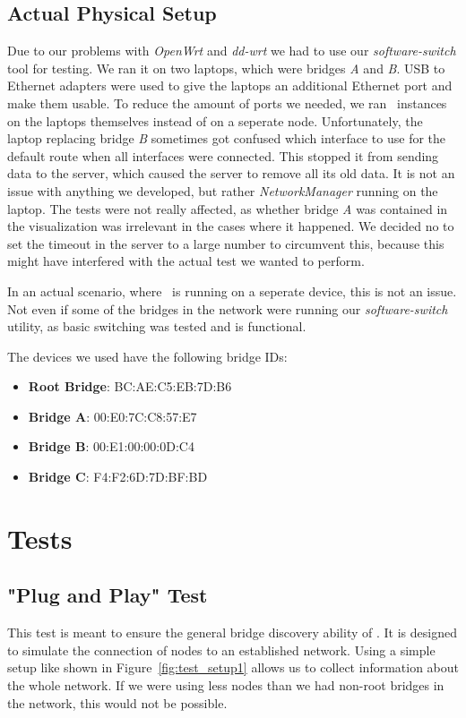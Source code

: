 \subsection*{Actual Physical Setup}
\label{physical_setup}
Due to our problems with \textit{OpenWrt} and \textit{dd-wrt} we had to use our \textit{software-switch} tool for testing.
We ran it on two laptops, which were bridges \textit{A} and \textit{B}.
USB to Ethernet adapters were used to give the laptops an additional Ethernet port and make them usable.
To reduce the amount of ports we needed, we ran \tool\ instances on the laptops themselves instead of on a seperate node.
Unfortunately, the laptop replacing bridge \textit{B} sometimes got confused which interface to use for the default route when all interfaces were connected.
This stopped it from sending data to the server, which caused the server to remove all its old data.
It is not an issue with anything we developed, but rather \textit{NetworkManager} running on the laptop.
The tests were not really affected, as whether bridge \textit{A} was contained in the visualization was irrelevant in the cases where it happened.
We decided no to set the timeout in the server to a large number to circumvent this, because this might have interfered with the actual test we wanted to perform.

In an actual scenario, where \tool\ is running on a seperate device, this is not an issue.
Not even if some of the bridges in the network were running our \textit{software-switch} utility, as basic switching was tested and is functional.

The devices we used have the following bridge IDs:
\begin{itemize}
    \item \textbf{Root Bridge}: BC:AE:C5:EB:7D:B6
    \item \textbf{Bridge A}: 00:E0:7C:C8:57:E7
    \item \textbf{Bridge B}: 00:E1:00:00:0D:C4
    \item \textbf{Bridge C}: F4:F2:6D:7D:BF:BD
\end{itemize}

\section{Tests}
\subsection*{"Plug and Play" Test}
\label{usage_test}
This test is meant to ensure the general bridge discovery ability of \tool.
It is designed to simulate the connection of nodes to an established network.
Using a simple setup like shown in Figure~\ref{fig:test_setup1} allows us to collect information about the whole network.
If we were using less nodes than we had non-root bridges in the network, this would not be possible.

